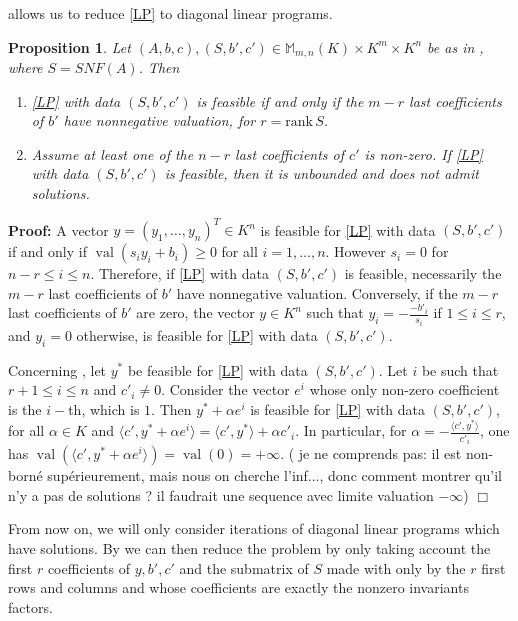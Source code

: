 \documentclass[a4paper,12pt]{article}
\newenvironment{proof}{\hbox{}\vspace{-0.8cm} {\bf Proof:}}{\hfill $\Box$}
\newtheorem{proposition}{Proposition}
\newcommand{\allmat}{\mathbb{M}} %
\newcommand{\corentin}[1]{{\color{red} #1}} %
\DeclareMathOperator{\val}{val}
\begin{document}
 allows us to reduce \eqref{LP} to diagonal linear programs.

\begin{proposition}\label{prop:reduc}
  Let $(A,b,c), (S,b',c') \in \allmat_{m,n}(K) \times K^m \times K^n$ be as in , where
  $S=SNF(A)$. Then
  \begin{enumerate}
  \item \label{prop:reduc_it1}
    \eqref{LP} with data $(S,b',c')$ is feasible if and only if the $m-r$ last coefficients
    of $b'$ have nonnegative valuation, for $r = \text{rank}\,S$.
  \item \label{prop:reduc_it2}
    Assume at least one of the $n-r$ last coefficients of $c'$ is non-zero. If \eqref{LP} with
    data $(S,b',c')$ is feasible, then it is unbounded and does not admit solutions.
  \end{enumerate}
\end{proposition}
\begin{proof}
  A vector $y = (y_1, \ldots, y_n)^T \in K^n$ is feasible for \eqref{LP} with data $(S,b',c')$
  if and only if $\val(s_i y_i + b_i) \geq 0$ for all $i = 1,\ldots,n$.
  However $s_i = 0$ for $n-r \leq i\leq n$. Therefore, if \eqref{LP} with data $(S,b',c')$ is feasible,
  necessarily the $m-r$ last coefficients of $b'$ have nonnegative valuation.
  Conversely, if the $m-r$ last coefficients of $b'$ are zero, the vector $y \in K^n$ such that
  $y_i = -\frac{-b'_i}{s_i}$ if $1 \leq i \leq r$, and $y_i =0$ otherwise, is feasible for \eqref{LP}
  with data $(S,b',c')$.

  Concerning , let $y^*$ be feasible for \eqref{LP} with data $(S,b',c')$.
  Let $i$ be such that $r+1 \leq i \leq n$ and $c'_i \neq 0$. Consider the vector $e^i$ whose only non-zero
  coefficient is the $i-$th, which is $1$. Then $y^* + \alpha e^i$ is feasible for \eqref{LP} with data $(S,b',c')$,
  for all $\alpha \in K$ and $\langle c', y^* + \alpha e^i\rangle = \langle c' , y^* \rangle + \alpha c'_i$.
  In particular, for $\alpha = -\frac{\langle c', y^* \rangle}{c'_i}$, one has $\val \left( \langle c', y^* +
  \alpha e ^i \rangle\right) = \val (0) = + \infty$. ({\color{blue} je ne comprends pas: il est non-borné
    supérieurement, mais nous on cherche l'inf..., donc comment montrer qu'il n'y a pas de solutions ? il faudrait
  une sequence avec limite valuation $-\infty$})
\end{proof}

From now on, we will only consider iterations of diagonal linear programs which have solutions.
By  we can then reduce the problem by only taking account the first $r$ coefficients of
$y, b', c'$ and the submatrix of $S$ made with only by the $r$ first rows and columns and whose coefficients
are exactly the nonzero invariants factors.
\end{document}
